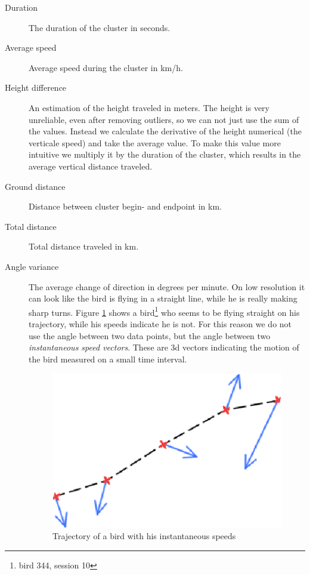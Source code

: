  \begin{description}
  \item[Duration] The duration of the cluster in seconds.
  \item[Average speed] Average speed during the cluster in km/h.
  \item[Height difference] An estimation of the height traveled in meters. The height is very unreliable, even after removing outliers, so we can not just use the sum of the values. Instead we calculate the derivative of the height numerical (the verticale speed) and take the average value. To make this value more intuitive we multiply it by the duration of the cluster, which results in the average vertical distance traveled.
  \item[Ground distance] Distance between cluster begin- and endpoint in km. 
  \item[Total distance] Total distance traveled in km.
  \item[Angle variance] The average change of direction in degrees per minute. On low resolution it can look like the bird is flying in a straight line, while he is really making sharp turns. Figure \ref{fig:anglevar1} shows a bird\footnote{bird 344, session 10} who seems to be flying straight on his trajectory, while his speeds indicate he is not. For this reason we do not use the angle between two data points, but the angle between two \emph{instantaneous speed vectors}. These are 3d vectors indicating the motion of the bird measured on a small time interval.

\begin{figure}[htb!]
\begin{center}
\includegraphics[scale=0.8]{anglevar2.png}
\end{center}
\caption{Trajectory of a bird with his instantaneous speeds} 
\label{fig:anglevar1}
\end{figure}


\end{description}
